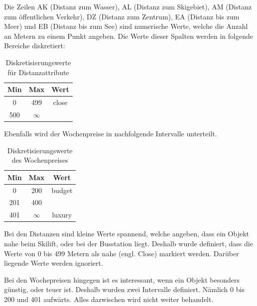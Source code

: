 Die Zeilen AK (Distanz zum Wasser), AL (Distanz zum Skigebiet), AM (Distanz zum öffentlichen Verkehr), DZ (Distanz zum Zentrum), EA (Distanz bis zum Meer) und EB (Distanz bis zum See) sind numerische Werte, welche die Anzahl an Metern zu einem Punkt angeben. Die Werte dieser Spalten werden in folgende Bereiche diskretiert: 

\begin{table}[h] 
	\caption{Diskretisierungswerte für Distanzattribute}
	\centering
	\label{fig:recherche:datenvorbereitung:1}
	\begin{tabular}{ | c | c | c | } 
		\hline 
		\rowcolor{tableheadcolor}
		\bfseries Min & \bfseries Max & \bfseries Wert \\ \hline 
		0 & 499 & close \\ \hline 
		500 & $\infty$ &   \\ \hline 
	\end{tabular}
\end{table}

Ebenfalls wird der Wochenpreise in nachfolgende Intervalle unterteilt.
\begin{table}[h] 
	\caption{Diskretisierungswerte des Wochenpreises}
	\centering
	\label{fig:recherche:datenvorbereitung:2}
	\begin{tabular}{ | c | c | c | } 
		\hline 
		\rowcolor{tableheadcolor}
		\bfseries Min & \bfseries Max & \bfseries Wert \\ \hline 
		0 & 200 & budget \\ \hline 
		201 & 400 &  \\ \hline 
		401 & $\infty$ & luxury \\ \hline 
	\end{tabular}
\end{table}

Bei den Distanzen sind kleine Werte spannend, welche angeben, dass ein Objekt nahe beim Skilift, oder bei der Busstation liegt. Deshalb wurde definiert, dass die Werte von 0 bis 499 Metern als nahe (engl. Close) markiert werden. Darüber liegende Werte werden ignoriert.

Bei den Wochepreisen hingegen ist es interessant, wenn ein Objekt besonders günstig, oder teuer ist. Deshalb wurden zwei Intervalle definiert. Nämlich 0 bis 200 und 401 aufwärts. Alles dazwischen wird nicht weiter behandelt.


